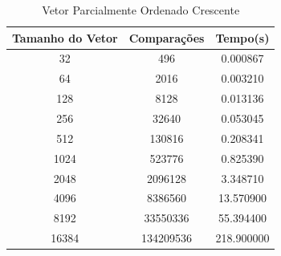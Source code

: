 \documentclass[12pt,a4paper,twoside]{report}
\begin{document}
\begin{table}[h]
  \centering
  \caption{Vetor Parcialmente Ordenado Crescente \label{tab:poc}}
  \begin{tabular}{ccc} \\\hline
  \textbf{Tamanho do Vetor} & \textbf{Comparações} & \textbf{Tempo(s)} \\\hline
  32                        & 496                  & 0.000867          \\\hline
  64                        & 2016                 & 0.003210          \\\hline
  128                       & 8128                 & 0.013136          \\\hline
  256                       & 32640                & 0.053045          \\\hline
  512                       & 130816               & 0.208341          \\\hline
  1024                      & 523776               & 0.825390          \\\hline
  2048                      & 2096128              & 3.348710          \\\hline
  4096                      & 8386560              & 13.570900         \\\hline
  8192                      & 33550336             & 55.394400        \\\hline
  16384                     & 134209536            & 218.900000        \\\hline
  \end{tabular}
\end{table}
\end{document}
